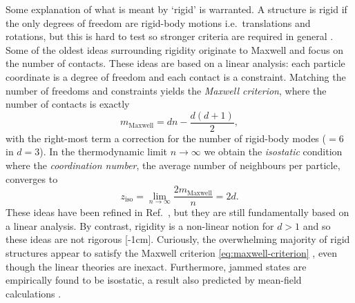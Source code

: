 \documentclass[11pt,twoside]{report}
\begin{document}
Some explanation of what is meant by `rigid' is warranted.
A structure is rigid if the only degrees of freedom are rigid-body motions i.e.\ translations and rotations, but this is hard to test so stronger criteria are required in general \cite{ConnellySJDM1996,Holmes-CerfonSR2016,Holmes-CerfonARCMP2017}.
Some of the oldest ideas surrounding rigidity originate to Maxwell \cite{MaxwellRigidity1864} and focus on the number of contacts.
These ideas are based on a linear analysis: each particle coordinate is a degree of freedom and each contact is a constraint.
Matching the number of freedoms and constraints yields the \emph{Maxwell criterion}, where the number of contacts is exactly \cite{MaxwellRigidity1864}
\begin{equation}\label{eq:maxwell-criterion}
  m_\mathrm{Maxwell} = dn - \frac{d(d+1)}{2},
\end{equation}
with the right-most term a correction for the number of rigid-body modes ($=6$ in $d=3$).
In the thermodynamic limit $n \to \infty$ we obtain the \emph{isostatic} condition where the \emph{coordination number}, the average number of neighbours per particle, converges to
\begin{equation*}
  z_\mathrm{iso}
  =
  \lim_{n \to \infty} \frac{2m_\mathrm{Maxwell}}{n}
  = 2d.
\end{equation*}
These ideas have been refined in Ref.\ \cite{CalladineIJSS1978}, but they are still fundamentally based on a linear analysis.
By contrast, rigidity is a non-linear notion for $d > 1$ and so these ideas are not rigorous%
[-1cm].
Curiously, the overwhelming majority of rigid structures appear to satisfy the Maxwell criterion \eqref{eq:maxwell-criterion} \cite{Holmes-CerfonSR2016,Holmes-CerfonARCMP2017}, even though the linear theories are inexact.
Furthermore, jammed states are empirically found to be isostatic, a result also predicted by mean-field calculations \cite{CharbonneauJSM2014,CharbonneauNC2014}.
\end{document}
